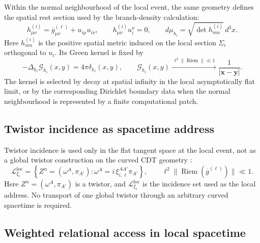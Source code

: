 Within the normal neighbourhood of the local event, the same geometry defines the
spatial rest section used by the branch-density calculation:
\begin{equation}
  h_{\mu\nu}^{(i)}=
  \overline g_{\mu\nu}^{(\ell)}+u_{i\mu}u_{i\nu},
  \qquad
  h_{\mu\nu}^{(i)}u_i^\nu=0,
  \qquad
  d\mu_{h_i}=\sqrt{\det h_{mn}^{(i)}}\,d^3x .
  \label{eq:cdt_rest_slice}
\end{equation}
\noindent Here $h_{mn}^{(i)}$ is the positive spatial metric induced on the local
section $\Sigma_i$ orthogonal to $u_i$. Its Green kernel is fixed by
\begin{equation}
  -\Delta_{h_i}\mathcal G_{h_i}(x,y)=4\pi\delta_{h_i}(x,y),
  \qquad
  \mathcal G_{h_i}(x,y)
  \xrightarrow{\ \ell^2\|\operatorname{Riem}\|\ll1\ }
  \frac{1}{|\mathbf x-\mathbf y|}.
  \label{eq:cdt_green_kernel}
\end{equation}
\noindent The kernel is selected by decay at spatial infinity in the local
asymptotically flat limit, or by the corresponding Dirichlet boundary data when the
normal neighbourhood is represented by a finite computational patch.

\subsection{Twistor incidence as spacetime address}

Twistor incidence is used only in the flat tangent space at the local event, not as
a global twistor construction on the curved CDT geometry \citep{penrose1967,frauendiener2000}:
\begin{equation}
  \mathcal L_{\xi_i}^{\mathrm{loc}}=
  \left\{Z^\alpha=(\omega^A,\pi_{A'}):
  \omega^A=i\,\xi_{i,\ell}^{AA'}\pi_{A'}\right\},
  \qquad \ell^2\|\operatorname{Riem}(\overline g^{(\ell)})\|\ll1.
  \label{eq:twistor_incidence}
\end{equation}
\noindent Here $Z^\alpha=(\omega^A,\pi_{A'})$ is a twistor, and
$\mathcal L_{\xi_i}^{\mathrm{loc}}$ is the incidence set used as the local address. No
transport of one global twistor through an arbitrary curved spacetime is required.

\subsection{Weighted relational access in local spacetime}

